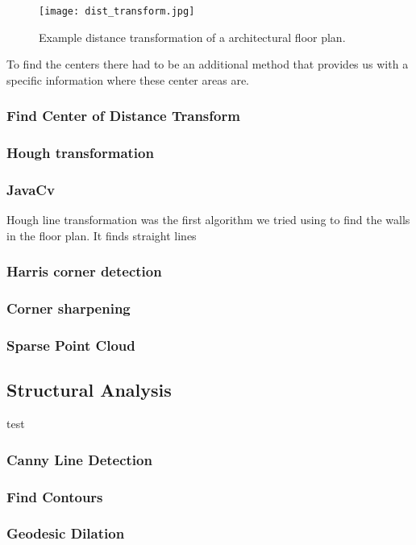 \begin{figure}[H]
	\centering
	\texttt{[image: dist\_transform.jpg]}
	\caption{Example distance transformation of a architectural floor plan.}
	\label{fig:dist_transform}
\end{figure}

To find the centers there had to be an additional method that provides us with a specific information where these center areas are.
\subsubsection{Find Center of Distance Transform}  
\subsubsection{Hough transformation}
\subsubsection{JavaCv}
Hough line transformation was the first algorithm we tried using to find the walls in the floor plan. It finds straight lines  
\subsubsection{Harris corner detection}
\subsubsection{Corner sharpening}
\subsubsection{Sparse Point Cloud}
\subsection{Structural Analysis}
test
\subsubsection{Canny Line Detection} 
\subsubsection{Find Contours}
\subsubsection{Geodesic Dilation}
